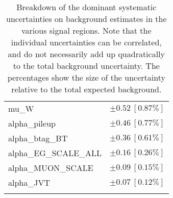 \begin{table}
\begin{center}
\begin{tabular*}{\textwidth}{@{\extracolsep{\fill}}lc}
mu\_W         & $\pm 0.52\ [0.87\%] $       \\
alpha\_pileup         & $\pm 0.46\ [0.77\%] $       \\
alpha\_btag\_BT         & $\pm 0.36\ [0.61\%] $       \\
alpha\_EG\_SCALE\_ALL         & $\pm 0.16\ [0.26\%] $       \\
alpha\_MUON\_SCALE         & $\pm 0.09\ [0.15\%] $       \\
alpha\_JVT         & $\pm 0.07\ [0.12\%] $       \\
\noalign{\smallskip}\hline\noalign{\smallskip}
\end{tabular*}
\end{center}
\caption[Breakdown of uncertainty on background estimates]{
Breakdown of the dominant systematic uncertainties on background estimates in the various signal regions.
Note that the individual uncertainties can be correlated, and do not necessarily add up quadratically to 
the total background uncertainty. The percentages show the size of the uncertainty relative to the total expected background.
\label{table.results.bkgestimate.uncertainties.STREM_cuts}}
\end{table}
%